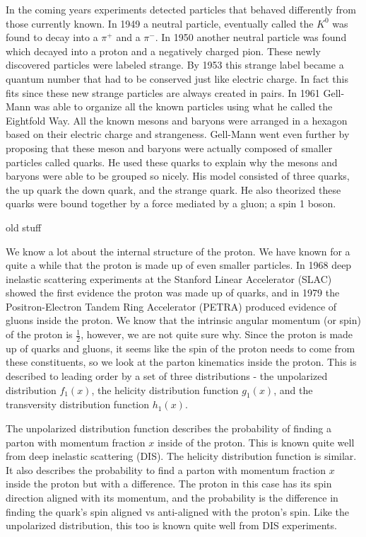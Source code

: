 \documentclass[abstract = on,listof=totoc, bibliography=totoc]{scrreprt}
\begin{document}
In the coming years experiments detected particles that behaved differently from those currently known. In 1949 a neutral particle, eventually called the $K^0$ was found to decay into a $\pi^+$ and a $\pi^-$. In 1950 another neutral particle was found which decayed into a proton and a negatively charged pion. These newly discovered particles were labeled strange. By 1953 this strange label became a quantum number that had to be conserved just like electric charge. In fact this fits since these new strange particles are always created in pairs. In 1961 Gell-Mann was able to organize all the known particles using what he called the Eightfold Way. All the known mesons and baryons were arranged in a hexagon based on their electric charge and strangeness.  Gell-Mann went even further by proposing that these meson and baryons were actually composed of smaller particles called quarks. He used these quarks to explain why the mesons and baryons were able to be grouped so nicely. His model consisted of three quarks, the up quark the down quark, and the strange quark. He also theorized these quarks were bound together by a force mediated by a gluon; a spin 1 boson. 



old stuff







We know a lot about the internal structure of the proton. We have known for a quite a while that the proton is made up of even smaller particles. In 1968 deep inelastic scattering experiments at the Stanford Linear Accelerator (SLAC) showed the first evidence the proton was made up of quarks, and in 1979 the Positron-Electron Tandem Ring Accelerator (PETRA) produced evidence of gluons inside the proton. We know that the intrinsic angular momentum (or spin) of the proton is $\frac{1}{2}$, however, we are not quite sure why. Since the proton is made up of quarks and gluons, it seems like the spin of the proton needs to come from these constituents, so we look at the parton kinematics inside the proton. This is described to leading order by a set of three distributions -  the unpolarized distribution $f_1(x)$, the helicity distribution function $g_1(x)$, and the transversity distribution function $h_1(x)$.            

The unpolarized distribution function describes the probability of finding a parton with momentum fraction $x$ inside of the proton. This is known quite well from deep inelastic scattering (DIS). The helicity distribution function is similar. It also describes the probability to find a parton with momentum fraction $x$ inside the proton but with a difference. The proton in this case has its spin direction aligned with its momentum, and the probability is the difference in finding the quark's spin aligned vs anti-aligned with the proton's spin. Like the unpolarized distribution, this too is known quite well from DIS experiments.
\end{document}
